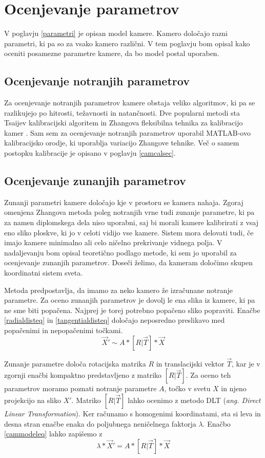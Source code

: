 \documentclass[a4paper, 12pt]{book}
\begin{document}
\section{Ocenjevanje parametrov}
V poglavju \ref{parametri} je opisan model kamere. Kamero določajo razni parametri, ki pa so za vsako kamero različni. V tem poglavju bom opisal kako oceniti posamezne parametre kamere, da bo model postal uporaben.

\subsection{Ocenjevanje notranjih parametrov}
Za ocenjevanje notranjih parametrov kamere obstaja veliko algoritmov, ki pa se razlikujejo po hitrosti, težavnosti in natančnosti. Dve popularni metodi sta Tsaijev kalibracijski algoritem \cite{horn2000tsai} in Zhangova fleksibilna tehnika za kalibracijo kamer \cite{zhang2000flexible}. Sam sem za ocenjevanje notranjih parametrov uporabil MATLAB-ovo kalibracijsko orodje, ki uporablja variacijo Zhangove tehnike. Več o samem postopku kalibracije je opisano v poglavju \ref{camcalsec}. 

\subsection{Ocenjevanje zunanjih parametrov}\label{externalparamssection}
Zunanji parametri kamere določajo kje v prostoru se kamera nahaja. Zgoraj omenjena Zhangova metoda poleg notranjih vrne tudi zunanje parametre, ki pa za namen diplomskega dela niso uporabni, saj bi morali kamere kalibrirati z vsaj eno sliko ploskve, ki jo v celoti vidijo vse kamere. Sistem mora delovati tudi, če imajo kamere minimalno ali celo ničelno prekrivanje vidnega polja. V nadaljevanju bom opisal teoretično podlago metode, ki sem jo uporabil za ocenjevanje zunanjih parametrov. Doseči želimo, da kameram določimo skupen koordinatni sistem sveta.

Metoda predpostavlja, da imamo za neko kamero že izračunane notranje parametre. Za oceno zunanjih parametrov je dovolj le ena slika iz kamere, ki pa ne sme biti popačena. Najprej je torej potrebno popačeno sliko popraviti. Enačbe \eqref{radialdisteq} in \eqref{tangentialdisteq} določajo neposredno preslikavo med popačenimi in nepopačenimi točkami. 
\begin{equation}
\vec{X}' \sim A * [R | \vec{T}] * \vec{X}
\label{cammodeleq}
\end{equation}

Zunanje parametre določa rotacijska matrika $R$ in translacijski vektor $\vec{T}$, kar je v zgornji enačbi kompaktno predstavljeno z matriko $[R | \vec{T}]$. Za oceno teh parametrov moramo poznati notranje parametre $A$, točko v svetu $X$ in njeno projekcijo na sliko $X'$. Matriko $[R | \vec{T}]$ lahko ocenimo z metodo DLT (\emph{ang. Direct Linear Transformation}). Ker računamo s homogenimi koordinatami, sta si leva in desna stran enačbe enaka do poljubnega neničelnega faktorja $\lambda$. Enačbo \eqref{cammodeleq} lahko zapišemo z
\begin{equation}
\lambda * \vec{X}' = A * [R | \vec{T}] * \vec{X}
\label{lambdaeq}
\end{equation}
\end{document}
